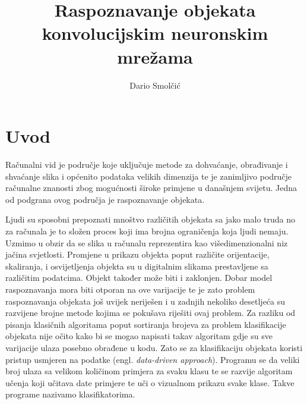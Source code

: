 \documentclass[times, utf8, zavrsni]{fer}
\begin{document}

\title{Raspoznavanje objekata konvolucijskim neuronskim mrežama}

\author{Dario Smolčić}

\maketitle

\izvornik

\zahvala{}

\tableofcontents

\chapter{Uvod}
Računalni vid je područje koje uključuje metode za dohvaćanje, obrađivanje i shvaćanje slika i općenito podataka velikih dimenzija te je zanimljivo područje računalne znanosti zbog mogućnosti široke primjene u današnjem svijetu. Jedna od podgrana ovog područja je raspoznavanje objekata.

Ljudi su sposobni prepoznati mnoštvo različitih objekata sa jako malo truda no za računala je to složen proces koji ima brojna ograničenja koja ljudi nemaju. Uzmimo u obzir da se slika u računalu reprezentira kao višedimenzionalni niz jačina svjetlosti. Promjene u prikazu objekta poput različite orijentacije, skaliranja, i osvijetljenja objekta su u digitalnim slikama prestavljene sa različitim podatcima. Objekt također može biti i zaklonjen. Dobar model raspoznavanja mora biti otporan na ove varijacije te je zato problem raspoznavanja objekata još uvijek neriješen i u zadnjih nekoliko desetljeća su razvijene brojne metode kojima se pokušava riješiti ovaj problem.
Za razliku od pisanja klasičnih algoritama poput sortiranja brojeva za problem klasifikacije objekata nije očito kako bi se mogao napisati takav algoritam gdje su sve varijacije ulaza posebno obrađene u kodu. Zato se za klasifikaciju objekata koristi pristup usmjeren na podatke (engl. \textit{data-driven approach}). Programu se da veliki broj ulaza sa velikom količinom primjera za svaku klasu te se razvije algoritam učenja koji učitava date primjere te uči o vizualnom prikazu svake klase. Takve programe nazivamo klasifikatorima.
\end{document}
